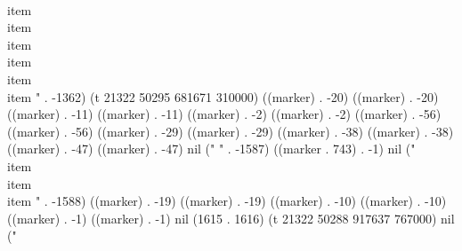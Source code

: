   \\item 
  \\item 
  \\item 
  \\item 
  \\item 
  \\item 
" . -1362) (t 21322 50295 681671 310000) ((marker) . -20) ((marker) . -20) ((marker) . -11) ((marker) . -11) ((marker) . -2) ((marker) . -2) ((marker) . -56) ((marker) . -56) ((marker) . -29) ((marker) . -29) ((marker) . -38) ((marker) . -38) ((marker) . -47) ((marker) . -47) nil (" " . -1587) ((marker . 743) . -1) nil ("
  \\item 
  \\item 
  \\item " . -1588) ((marker) . -19) ((marker) . -19) ((marker) . -10) ((marker) . -10) ((marker) . -1) ((marker) . -1) nil (1615 . 1616) (t 21322 50288 917637 767000) nil ("
